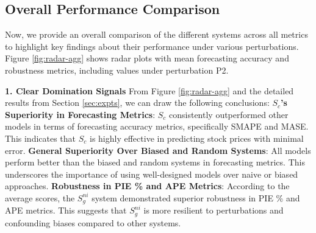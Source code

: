 \subsection{Overall Performance Comparison}

Now, we provide  an overall comparison of the different systems across all metrics to highlight key findings about their performance under various perturbations. Figure \ref{fig:radar-agg} shows radar plots with mean forecasting accuracy and robustness metrics, including values under perturbation P2. 

\noindent \textbf{1. Clear Domination Signals} From Figure \ref{fig:radar-agg} and the detailed results from Section \ref{sec:expts}, we can draw the following conclusions: \textbf{$S_c$'s Superiority in Forecasting Metrics}: $S_c$ consistently outperformed other models in terms of forecasting accuracy metrics, specifically SMAPE and MASE. This indicates that $S_c$ is highly effective in predicting stock prices with minimal error.
\textbf{General Superiority Over Biased and Random Systems}: All models perform better than the biased and random systems in forecasting metrics. This underscores the importance of using well-designed models over naive or biased approaches.
\textbf{Robustness in PIE \% and APE Metrics}: According to the average scores, the $S_g^{ni}$ system demonstrated superior robustness in PIE \% and APE metrics. This suggests that $S_g^{ni}$ is more resilient to perturbations and confounding biases compared to other systems.


    
